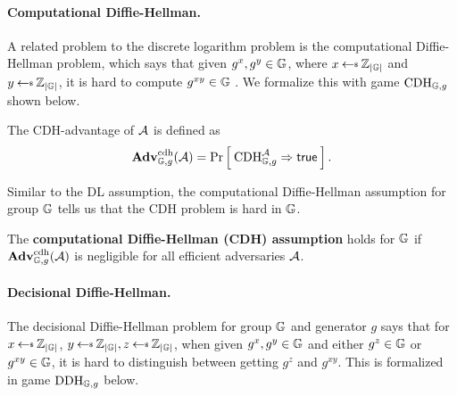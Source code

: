 \paragraph{Computational Diffie-Hellman.} A related problem to the discrete logarithm problem is the computational Diffie-Hellman problem, which says that given $g^x, g^y \in \mathbb{G}$, where $x \getsr \Z_{|\group|}$ and $y \getsr \Z_{|\group|}$, it is hard to compute $g^{xy} \in \mathbb{G}$ \cite{BonehShoupBook}. We formalize this with game $\textnormal{CDH}_{\mathbb{G}, g}$ shown below.  

\begin{center}
\end{center}

The CDH-advantage of ${\mathcal A}$ is defined as 
\begin{equation*}
\mathbf{Adv}^{\mathrm{cdh}}_{\mathbb{G}, g}({\mathcal A}) = \Pr\left[\: \textnormal{CDH}^{\mathcal A}_{\mathbb{G}, g}\Rightarrow\mathsf{true} \:\right].
\end{equation*}

Similar to the DL assumption, the computational Diffie-Hellman assumption for group $\mathbb{G}$ tells us that the CDH problem is hard in $\mathbb{G}$.

\begin{definition}
	The \textbf{computational Diffie-Hellman (CDH) assumption} holds for $\mathbb{G}$ if $\mathbf{Adv}^{\mathrm{cdh}}_{\mathbb{G}, g}({\mathcal A})$ is negligible for all efficient adversaries ${\mathcal A}$.
\end{definition}

\paragraph{Decisional Diffie-Hellman.} The decisional Diffie-Hellman problem for group $\mathbb{G}$ and generator $g$ says that for $x \getsr \Z_{|\group|}$, $y \getsr \Z_{|\group|}, z \getsr \Z_{|\group|}$, when given $g^x,g^y \in \mathbb{G}$ and either $g^z \in \mathbb{G}$ or $g^{xy} \in \mathbb{G}$, it is hard to distinguish between getting $g^z$ and $g^{xy}$. This is formalized in game $\textnormal{DDH}_{\mathbb{G},g}$ below.  

